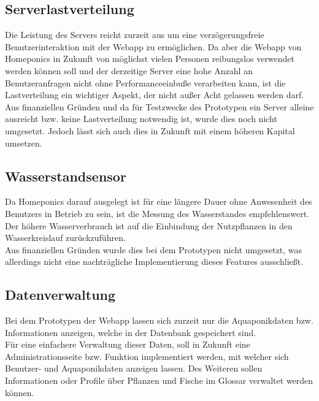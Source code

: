 \newpage

\subsection{Serverlastverteilung}
Die Leistung des Servers reicht zurzeit aus um eine verzögerungsfreie Benutzerinteraktion mit der Webapp zu ermöglichen. Da aber die Webapp von Homeponics in Zukunft von möglichst vielen Personen reibungslos verwendet werden können soll und der derzeitige Server eine hohe Anzahl an Benutzeranfragen nicht ohne Performanceeinbuße verarbeiten kann, ist die Lastverteilung ein wichtiger Aspekt, der nicht außer Acht gelassen werden darf.\\Aus finanziellen Gründen und da für Testzwecke des Prototypen ein Server alleine ausreicht bzw. keine Lastverteilung notwendig ist, wurde dies noch nicht umgesetzt. Jedoch lässt sich auch dies in Zukunft mit einem höheren Kapital umsetzen.

\subsection{Wasserstandsensor}
Da Homeponics darauf ausgelegt ist für eine längere Dauer ohne Anwesenheit des Benutzers in Betrieb zu sein, ist die Messung des Wasserstandes empfehlenswert. Der höhere Wasserverbrauch ist auf die Einbindung der Nutzpflanzen in den Wasserkreislauf zurückzuführen. \\
Aus finanziellen Gründen wurde dies bei dem Prototypen nicht umgesetzt, was allerdings nicht eine nachträgliche Implementierung dieses Features ausschließt. 

\subsection{Datenverwaltung}
Bei dem Prototypen der Webapp lassen sich zurzeit nur die Aquaponikdaten bzw. Informationen anzeigen, welche in der Datenbank gespeichert sind.\\
Für eine einfachere Verwaltung dieser Daten, soll in Zukunft eine Administrationsseite bzw. Funktion implementiert werden, mit welcher sich Benutzer- und Aquaponikdaten anzeigen lassen. Des Weiteren sollen Informationen oder Profile über Pflanzen und Fische im Glossar verwaltet werden können.

\newpage
\blankpage
\blankpage